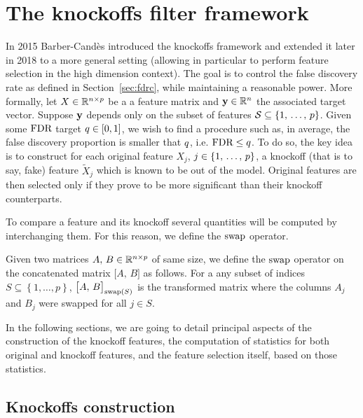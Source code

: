 \chapter{The knockoffs filter framework}\label{ch:knockoffs}

In 2015 Barber-Candès introduced the knockoffs framework and extended it later in 2018 to a more general setting
(allowing in particular to perform feature selection in the high dimension context).
The goal is to control the false discovery rate as defined in Section~\ref{sec:fdrc}, while maintaining a reasonable power.
More formally, let $X \in \mathbb{R}^{n \times p}$ be a a feature matrix and $\mathbf{y} \in \mathbb{R}^n$ the associated target vector.
Suppose $\mathbf{y}$ depends only on the subset of features $\mathcal{S} \subseteq \left\{ 1,\, \dots,\, p \right\}$.
Given some $\text{FDR}$ target $q \in [0, 1]$, we wish to find a procedure such as, in average,
the false discovery proportion is smaller that $q$, i.e. $\text{FDR} \leq q$.
To do so, the key idea is to construct for each original feature $X_j$, $j \in \left\{ 1,\, \dots,\, p \right\}$,
a knockoff (that is to say, fake) feature $\tilde{X}_j$ which is known to be out of the model.
Original features are then selected only if they prove to be more significant than their knockoff counterparts.

To compare a feature and its knockoff several quantities will be computed by interchanging them.
For this reason, we define the $\operatorname{swap}$ operator.
\begin{definition}\label{def:swap}
    Given two matrices $A,\,B \in \mathbb{R}^{n \times p}$ of same size,
    we define the $\operatorname{swap}$ operator on the concatenated matrix $\big[ A,\, B \big]$ as follows.
    For a any subset of indices $S \subseteq \left\{ 1, \dots, p \right\}$,
    $\big[ A,\, B \big]_{\operatorname{swap}(S)}$ is the transformed matrix where the columns $A_j$ and $B_j$ were swapped for all
    $j \in S$.
\end{definition}

In the following sections, we are going to detail principal aspects of the construction of the knockoff features,
the computation of statistics for both original and knockoff features,
and the feature selection itself, based on those statistics.

\section{Knockoffs construction}\label{sec:kc}

